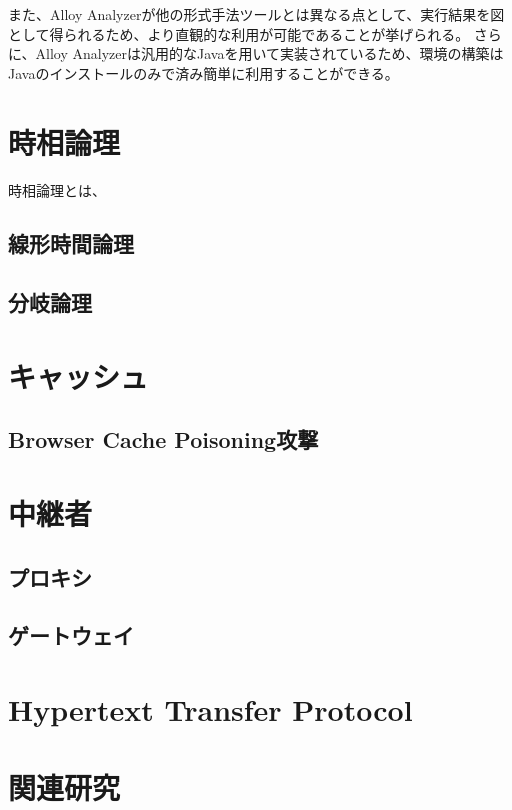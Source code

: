 また、Alloy Analyzerが他の形式手法ツールとは異なる点として、実行結果を図として得られるため、より直観的な利用が可能であることが挙げられる。
さらに、Alloy Analyzerは汎用的なJavaを用いて実装されているため、環境の構築はJavaのインストールのみで済み簡単に利用することができる。

\section{時相論理}
時相論理とは、

\subsection{線形時間論理}


\subsection{分岐論理}


\section{キャッシュ}


\subsection{Browser Cache Poisoning攻撃}

\section{中継者}
\subsection{プロキシ}
\subsection{ゲートウェイ}

\section{Hypertext Transfer Protocol}

\section{関連研究}
